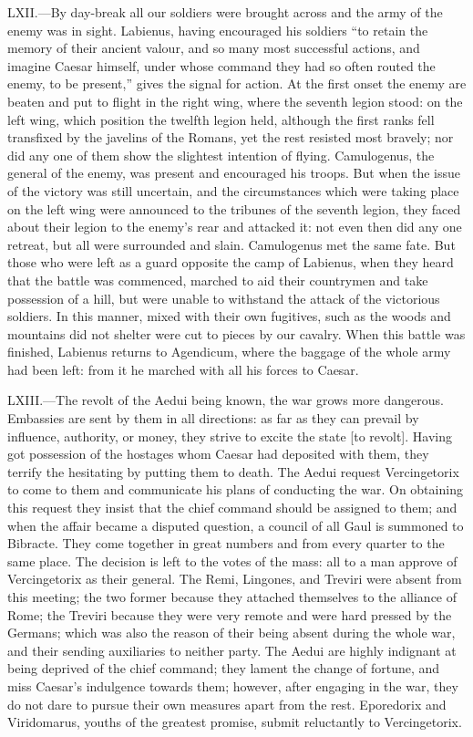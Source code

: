 LXII.—By day-break all our soldiers were brought across and the army of
the enemy was in sight. Labienus, having encouraged his soldiers ``to
retain the memory of their ancient valour, and so many most successful
actions, and imagine Caesar himself, under whose command they had so
often routed the enemy, to be present,'' gives the signal for action. At
the first onset the enemy are beaten and put to flight in the right
wing, where the seventh legion stood: on the left wing, which position
the twelfth legion held, although the first ranks fell transfixed by the
javelins of the Romans, yet the rest resisted most bravely; nor did any
one of them show the slightest intention of flying. Camulogenus, the
general of the enemy, was present and encouraged his troops. But when
the issue of the victory was still uncertain, and the circumstances
which were taking place on the left wing were announced to the tribunes
of the seventh legion, they faced about their legion to the enemy's rear
and attacked it: not even then did any one retreat, but all were
surrounded and slain. Camulogenus met the same fate. But those who were
left as a guard opposite the camp of Labienus, when they heard that the
battle was commenced, marched to aid their countrymen and take
possession of a hill, but were unable to withstand the attack of the
victorious soldiers. In this manner, mixed with their own fugitives,
such as the woods and mountains did not shelter were cut to pieces by
our cavalry. When this battle was finished, Labienus returns to
Agendicum, where the baggage of the whole army had been left: from it he
marched with all his forces to Caesar.

LXIII.—The revolt of the Aedui being known, the war grows more
dangerous. Embassies are sent by them in all directions: as far as they
can prevail by influence, authority, or money, they strive to excite the
state [to revolt]. Having got possession of the hostages whom Caesar had
deposited with them, they terrify the hesitating by putting them to
death. The Aedui request Vercingetorix to come to them and communicate
his plans of conducting the war. On obtaining this request they insist
that the chief command should be assigned to them; and when the affair
became a disputed question, a council of all Gaul is summoned to
Bibracte. They come together in great numbers and from every quarter to
the same place. The decision is left to the votes of the mass: all to a
man approve of Vercingetorix as their general. The Remi, Lingones, and
Treviri were absent from this meeting; the two former because they
attached themselves to the alliance of Rome; the Treviri because they
were very remote and were hard pressed by the Germans; which was also
the reason of their being absent during the whole war, and their sending
auxiliaries to neither party. The Aedui are highly indignant at being
deprived of the chief command; they lament the change of fortune, and
miss Caesar's indulgence towards them; however, after engaging in the
war, they do not dare to pursue their own measures apart from the rest.
Eporedorix and Viridomarus, youths of the greatest promise, submit
reluctantly to Vercingetorix.

